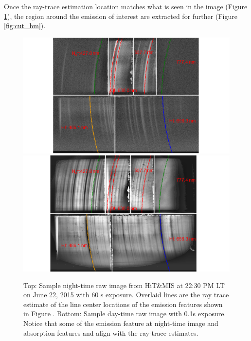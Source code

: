\documentclass[crop=false,class=mitthesis,oneside,font=12pt]{standalone}
\begin{document}
Once the ray-trace estimation location matches what is seen in the image (Figure \ref{fig:raw_line}), the region around the emission of interest are extracted for further (Figure \ref{fig:cut_hm}). 
\begin{figure}[H]
	\centering\includegraphics[width=32pc]{night_hm.png}
    \centering\includegraphics[width=32pc]{day_hm.png}
	\caption{Top: Sample night-time raw image from HiT\&MIS at 22:30 PM LT on June 22, 2015 with 60 s exposure. Overlaid lines are the ray trace estimate of the line center locations of the emission features shown in Figure . Bottom: Sample day-time raw image with 0.1s exposure. Notice that some of the emission feature at night-time image and absorption features and align with the ray-trace estimates.}
	\label{fig:raw_line}
\end{figure}
\end{document}
